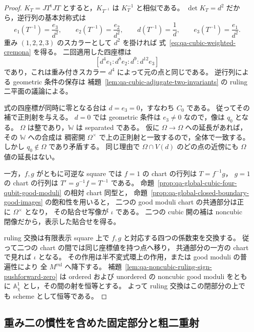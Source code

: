 \begin{proof}
$K_T=JT^{\mathrm{t}}JT$ とすると，$K_{T^{-1}}$ は $K_T^{-1}$ と相似である。
$\det K_T=d^2$ だから，逆行列の基本対称式は
\[
 e_1(T^{-1})=\frac{e_3}{d^2},\qquad
 e_2(T^{-1})=\frac{e_2}{d^2},\qquad
 d(T^{-1})=\frac1d,\qquad
 e_3(T^{-1})=\frac{e_1}{d^2}.
\]
重み $(1,2,2,3)$ のスカラーとして $d^2$ を掛ければ
式~\eqref{eq:qa-cubic-weighted-cremona} を得る。
二回適用した四座標は
\[
 [d^4e_1:d^8e_2:d^9:d^{12}e_3]
\]
であり，これは重み付きスカラー $d^4$ によって元の点と同じである。
逆行列による geometric 条件の保存は
補題~\ref{lem:qa-cubic-adjugate-two-invariants} の ruling 二平面の議論による。

式の四座標が同時に零となる台は $d=e_3=0$，すなわち $C_0$ である。
従ってその補で正則射を与える。
$d=0$ では geometric 条件は $e_3\ne0$ なので，像は $q_0$ となる。
$\Omega$ は整であり，$\mathbb W$ は separated である。
仮に $\Omega\to\Omega$ への延長があれば，その $\mathbb W$ への合成は
稠密開 $\Omega^\times$ で上の正則射と一致するので，全体で一致する。
しかし $q_0\notin\Omega$ であり矛盾する。
同じ理由で $\Omega\cap V(d)$ のどの点の近傍にも $\Omega$ 値の延長はない。

一方，$f,g$ がともに可逆な square では
$f=1$ の chart の行列は $T=f^{-1}g$，
$g=1$ の chart の行列は $T'=g^{-1}f=T^{-1}$ である。
命題~\ref{prop:qa-global-cubic-four-qubit-good-moduli} の相対 chart 同型と，
命題~\ref{prop:qa-global-closed-boundary-good-images} の飽和性を用いると，
二つの good moduli chart の共通部分は正に $\Omega^\times$ となり，
その貼合せ写像が $\iota$ である。
二つの cubic 開の補は noncubic 閉像だから，表示した貼合せを得る。

ruling 交換は有限表示 square 上で $f,g$ と対応する四つの係数束を交換する。
従って二つの chart の間では同じ座標値を持つ点へ移り，
共通部分の一方の chart で見れば $\iota$ となる。
その作用は半不変式環上の作用，または good moduli の普遍性により
全 $M^{\mathrm{rul}}$ へ降下する。
補題~\ref{lem:qa-noncubic-ruling-sign-pushforward-zero} は
ordered および unordered の noncubic good moduli をともに
$\mathbb A^1_\chi$ とし，その間の射を恒等とする。
よって ruling 交換はこの閉部分の上でも scheme として恒等である。
\end{proof}

\subsection{重み二の慣性を含めた固定部分と粗二重射}

